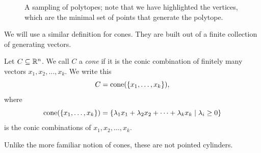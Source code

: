 \documentclass[12pt,oneside]{../../sfsuthesis}
\begin{document}
\begin{figure}[H]
\begin{subfigure}[t]{0.4\textwidth}
    \end{subfigure}
    \caption{A sampling of polytopes; note that we have highlighted the vertices, which are the minimal set of points that generate the polytope.}
\end{figure}

We will use a similar definition for cones.
They are built out of a finite collection of generating vectors.
\begin{definition}[Cone]\th\label{def:cone}
    Let \( C \subseteq \mathbb{R}^n \).
    We call \( C \) a \emph{cone} if it is the conic combination of finitely many vectors \( x_1, x_2, \dots, x_k \).
    We write this
    \[
        C = \mathrm{cone}(\{x_1, \dots, x_k\}),
    \]
    where
    \[
        \mathrm{cone}(\{x_1, \dots, x_k\}) = \left\{ \lambda_1 x_1 + \lambda_2 x_2 + \cdots + \lambda_k x_k \; \middle| \; \lambda_i \geq 0 \right\}
    \]
    is the conic combinations of \( x_1, x_2, \dots, x_k \).

\end{definition}
Unlike the more familiar notion of cones, these are not pointed cylinders.
\end{document}
